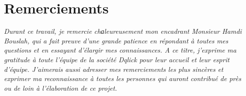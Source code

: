 \chapter*{\huge \vspace{2cm} Remerciements}
\textit{\Large
\vspace{0.5cm}Durant  ce travail, je remercie chаleureusement mon encadrant \vspace{0.5cm}Monsieur Hamdi Bouslah, qui a fait preuve d'une grande patience      \vspace{0.5cm}en répondant à toutes mes questions et en essayant d’élargir mes \vspace{0.5cm}connaissances. A ce titre, j’exprime ma gratitude à toute l’équipe de \vspace{0.5cm}la société Dqlick pour leur accueil et leur esprit d’équipe.
\vspace{0.5cm}J'aimerais aussi  adresser mes remerciements les plus sincères et \vspace{0.5cm}exprimer ma reconnaissance à toutes les personnes qui auront contribué \vspace{0.5cm}de près ou de loin à l’élaboration de ce projet.}
\begin{center}
\it \Large
   
\end{center}